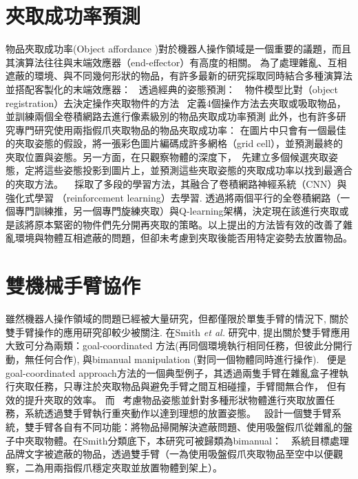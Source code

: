 \section{夾取成功率預測}
物品夾取成功率(Object affordance )對於機器人操作領域是一個重要的議題，而且其演算法往往與末端效應器（end-effector）有高度的相關。
為了處理雜亂、互相遮蔽的環境、與不同幾何形狀的物品，有許多最新的研究採取同時結合多種演算法並搭配客製化的末端效應器：
~\cite{zeng2016multi}透過經典的姿態預測：　物件模型比對（object　registration）去決定操作夾取物件的方法
~\cite{zeng2018robotic}定義4個操作方法去夾取或吸取物品，並訓練兩個全卷積網路去進行像素級別的物品夾取成功率預測
此外，也有許多研究專門研究使用兩指假爪夾取物品的物品夾取成功率： \cite{redmon2015real} 在圖片中只會有一個最佳的夾取姿態的假設，將一張彩色圖片編碼成許多網格（grid cell），並預測最終的夾取位置與姿態。另一方面，在只觀察物體的深度下，~\cite{mahler2017dex}先建立多個候選夾取姿態，定將這些姿態投影到圖片上，並預測這些夾取姿態的夾取成功率以找到最適合的夾取方法。
~\cite{pinto2016supersizing} 採取了多段的學習方法，其融合了卷積網路神經系統（CNN）與強化式學習 （reinforcement learning）去學習. \cite{zeng2018learning}透過將兩個平行的全卷積網路（一個專門訓練推，另一個專門旋練夾取）與Q-learning架構，決定現在該進行夾取或是該將原本緊密的物件們先分開再夾取的策略。以上提出的方法皆有效的改善了雜亂環境與物體互相遮蔽的問題，但卻未考慮到夾取後能否用特定姿勢去放置物品。

\section{雙機械手臂協作}
雖然機器人操作領域的問題已經被大量研究，但都僅限於單隻手臂的情況下, 關於雙手臂操作的應用研究卻較少被關注. 在Smith \textit{et al.} \cite{smith2012dual}研究中,
提出關於雙手臂應用大致可分為兩類：goal-coordinated 方法(再同個環境執行相同任務，但彼此分開行動，無任何合作), 與bimanual manipulation (對同一個物體同時進行操作).
~\cite{schwarz2018fast}便是goal-coordinated approach方法的一個典型例子，其透過兩隻手臂在雜亂盒子裡執行夾取任務，只專注於夾取物品與避免手臂之間互相碰撞，手臂間無合作，
但有效的提升夾取的效率。 而~\cite{harada2012pick} 考慮物品姿態並針對多種形狀物體進行夾取放置任務，系統透過雙手臂執行重夾動作以達到理想的放置姿態。
~\cite{miyazaki2017object}設計一個雙手臂系統，雙手臂各自有不同功能：將物品掃開解決遮蔽問題、使用吸盤假爪從雜亂的盤子中夾取物體。在Smith分類底下，本研究可被歸類為bimanual：　系統目標處理品牌文字被遮蔽的物品，透過雙手臂（一為使用吸盤假爪夾取物品至空中以便觀察，二為用兩指假爪穩定夾取並放置物體到架上）。

